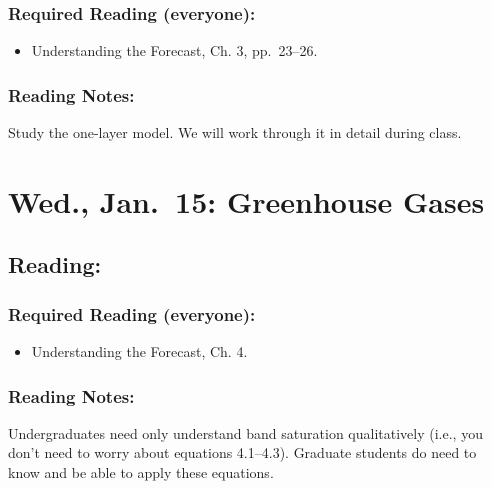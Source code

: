 \documentclass[
]{article}
\providecommand{\tightlist}{%
  \setlength{\itemsep}{0pt}\setlength{\parskip}{0pt}}
\begin{document}
\hypertarget{required-reading-everyone-2}{%
\subsubsection{Required Reading
(everyone):}\label{required-reading-everyone-2}}

\begin{itemize}
\tightlist
\item
  Understanding the Forecast, Ch. 3, pp.~23--26.
\end{itemize}

\hypertarget{reading-notes-2}{%
\subsubsection{Reading Notes:}\label{reading-notes-2}}

Study the one-layer model. We will work through it in detail during
class.

\hypertarget{wed.-jan.-15-greenhouse-gases}{%
\section{Wed., Jan.~15: Greenhouse
Gases}\label{wed.-jan.-15-greenhouse-gases}}

\hypertarget{reading-4}{%
\subsection{Reading:}\label{reading-4}}

\hypertarget{required-reading-everyone-3}{%
\subsubsection{Required Reading
(everyone):}\label{required-reading-everyone-3}}

\begin{itemize}
\tightlist
\item
  Understanding the Forecast, Ch. 4.
\end{itemize}

\hypertarget{reading-notes-3}{%
\subsubsection{Reading Notes:}\label{reading-notes-3}}

Undergraduates need only understand band saturation qualitatively (i.e.,
you don't need to worry about equations 4.1--4.3). Graduate students do
need to know and be able to apply these equations.
\end{document}
